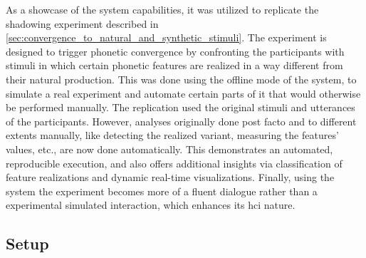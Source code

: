 As a showcase of the system capabilities, it was utilized to replicate the shadowing experiment described in \cref{sec:convergence_to_natural_and_synthetic_stimuli}.
The experiment is designed to trigger phonetic convergence by confronting the participants with stimuli in which certain phonetic features are realized in a way different from their natural production.
This was done using the offline mode of the system, to simulate a real experiment and automate certain parts of it that would otherwise be performed manually.
The replication used the original stimuli and utterances of the participants.
However, analyses originally done post facto and to different extents manually, like detecting the realized variant, measuring the features' values, etc., are now done automatically.
This demonstrates an automated, reproducible execution, and also offers additional insights via classification of feature realizations and dynamic real-time visualizations.
Finally, using the system the experiment becomes more of a fluent dialogue rather than a experimental simulated interaction, which enhances its \ac{hci} nature.

\subsection{Setup}
\label{subsec:setup_adjustments}

